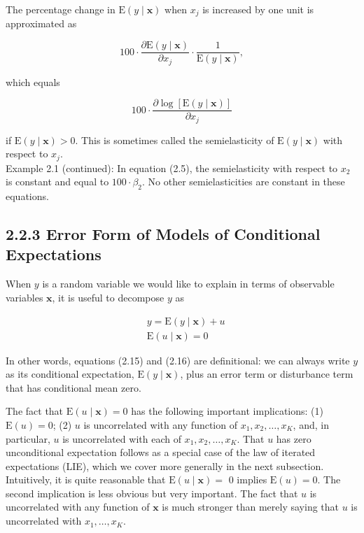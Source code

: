 \documentclass[10pt]{article}
\begin{document}
The percentage change in $\mathrm{E}(y \mid \mathbf{x})$ when $x_{j}$ is increased by one unit is approximated as


\begin{equation*}
100 \cdot \frac{\partial \mathrm{E}(y \mid \mathbf{x})}{\partial x_{j}} \cdot \frac{1}{\mathrm{E}(y \mid \mathbf{x})}, \tag{2.13}
\end{equation*}


which equals


\begin{equation*}
100 \cdot \frac{\partial \log [\mathrm{E}(y \mid \mathbf{x})]}{\partial x_{j}} \tag{2.14}
\end{equation*}


if $\mathrm{E}(y \mid \mathbf{x})>0$. This is sometimes called the semielasticity of $\mathrm{E}(y \mid \mathbf{x})$ with respect to $x_{j}$.\\
Example 2.1 (continued): In equation (2.5), the semielasticity with respect to $x_{2}$ is constant and equal to $100 \cdot \beta_{2}$. No other semielasticities are constant in these equations.

\subsection*{2.2.3 Error Form of Models of Conditional Expectations}
When $y$ is a random variable we would like to explain in terms of observable variables $\mathbf{x}$, it is useful to decompose $y$ as


\begin{align*}
& y=\mathrm{E}(y \mid \mathbf{x})+u  \tag{2.15}\\
& \mathrm{E}(u \mid \mathbf{x})=0 \tag{2.16}
\end{align*}


In other words, equations (2.15) and (2.16) are definitional: we can always write $y$ as its conditional expectation, $\mathrm{E}(y \mid \mathbf{x})$, plus an error term or disturbance term that has conditional mean zero.

The fact that $\mathrm{E}(u \mid \mathbf{x})=0$ has the following important implications: (1) $\mathrm{E}(u)=0$; (2) $u$ is uncorrelated with any function of $x_{1}, x_{2}, \ldots, x_{K}$, and, in particular, $u$ is uncorrelated with each of $x_{1}, x_{2}, \ldots, x_{K}$. That $u$ has zero unconditional expectation follows as a special case of the law of iterated expectations (LIE), which we cover more generally in the next subsection. Intuitively, it is quite reasonable that $\mathrm{E}(u \mid \mathbf{x})=$ 0 implies $\mathrm{E}(u)=0$. The second implication is less obvious but very important. The fact that $u$ is uncorrelated with any function of $\mathbf{x}$ is much stronger than merely saying that $u$ is uncorrelated with $x_{1}, \ldots, x_{K}$.
\end{document}
